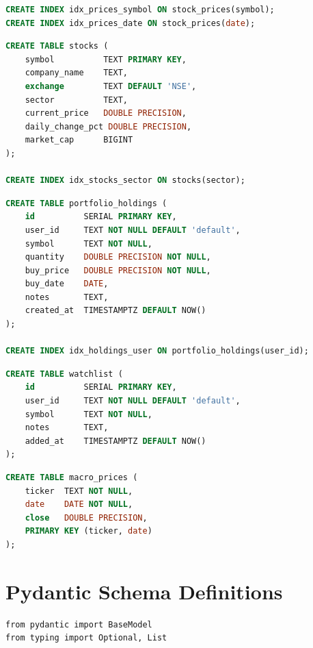 \documentclass[12pt, a4paper, oneside]{report}
\begin{document}
\begin{appendices}
\begin{lstlisting}[style=pythonstyle, caption={stock\_prices table DDL}, label={lst:ddl_prices}, language=SQL]
CREATE INDEX idx_prices_symbol ON stock_prices(symbol);
CREATE INDEX idx_prices_date ON stock_prices(date);
\end{lstlisting}

\begin{lstlisting}[style=pythonstyle, caption={stocks table DDL}, label={lst:ddl_stocks}, language=SQL]
CREATE TABLE stocks (
    symbol          TEXT PRIMARY KEY,
    company_name    TEXT,
    exchange        TEXT DEFAULT 'NSE',
    sector          TEXT,
    current_price   DOUBLE PRECISION,
    daily_change_pct DOUBLE PRECISION,
    market_cap      BIGINT
);

CREATE INDEX idx_stocks_sector ON stocks(sector);
\end{lstlisting}

\begin{lstlisting}[style=pythonstyle, caption={portfolio\_holdings table DDL}, label={lst:ddl_holdings}, language=SQL]
CREATE TABLE portfolio_holdings (
    id          SERIAL PRIMARY KEY,
    user_id     TEXT NOT NULL DEFAULT 'default',
    symbol      TEXT NOT NULL,
    quantity    DOUBLE PRECISION NOT NULL,
    buy_price   DOUBLE PRECISION NOT NULL,
    buy_date    DATE,
    notes       TEXT,
    created_at  TIMESTAMPTZ DEFAULT NOW()
);

CREATE INDEX idx_holdings_user ON portfolio_holdings(user_id);
\end{lstlisting}

\begin{lstlisting}[style=pythonstyle, caption={watchlist table DDL}, label={lst:ddl_watchlist}, language=SQL]
CREATE TABLE watchlist (
    id          SERIAL PRIMARY KEY,
    user_id     TEXT NOT NULL DEFAULT 'default',
    symbol      TEXT NOT NULL,
    notes       TEXT,
    added_at    TIMESTAMPTZ DEFAULT NOW()
);
\end{lstlisting}

\begin{lstlisting}[style=pythonstyle, caption={macro\_prices table DDL}, label={lst:ddl_macro}, language=SQL]
CREATE TABLE macro_prices (
    ticker  TEXT NOT NULL,
    date    DATE NOT NULL,
    close   DOUBLE PRECISION,
    PRIMARY KEY (ticker, date)
);
\end{lstlisting}


\chapter{Pydantic Schema Definitions}
\label{app:schemas}

\begin{lstlisting}[style=pythonstyle, caption={Key Pydantic response schemas}, label={lst:pydantic_schemas}]
from pydantic import BaseModel
from typing import Optional, List


\end{lstlisting}
\end{appendices}
\end{document}
